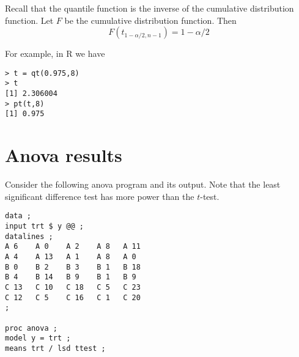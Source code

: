\documentclass[12pt]{article}
\begin{document}
Recall that the quantile function
is the inverse of the cumulative
distribution function.
Let $F$ be the cumulative distribution function.
Then
\[
F(t_{1-\alpha/2,n-1})=1-\alpha/2
\]

For example, in R we have

{\scriptsize\begin{verbatim}
> t = qt(0.975,8)
> t
[1] 2.306004
> pt(t,8)
[1] 0.975
\end{verbatim}}

\newpage

\section{Anova results}

Consider the following anova program and its output.
Note that the least significant difference test has more power than the $t$-test.

{\scriptsize\begin{verbatim}
data ;
input trt $ y @@ ;
datalines ;
A 6    A 0    A 2    A 8   A 11
A 4    A 13   A 1    A 8   A 0
B 0    B 2    B 3    B 1   B 18
B 4    B 14   B 9    B 1   B 9
C 13   C 10   C 18   C 5   C 23
C 12   C 5    C 16   C 1   C 20
;

proc anova ;
model y = trt ;
means trt / lsd ttest ;
\end{verbatim}}
\end{document}
